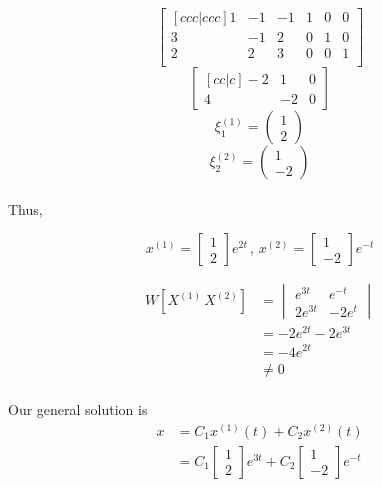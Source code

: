 \documentclass[letterpaper,12pt]{article}
\begin{document}
\[
\begin{bmatrix}[ccc|ccc]
     1& -1 & -1 & 1 & 0 & 0\\
    3 & -1 & 2 & 0 & 1 & 0\\
    2 & 2 & 3 & 0 & 0 & 1\\
\end{bmatrix}
\]
    \[
    \begin{bmatrix}[cc|c]
        -2 & 1 &0\\
        4 & -2 &0
\end{bmatrix}
\] 
\[
    \xi_1^{(1)} = 
    \begin{pmatrix}
        1 \\ 2
    \end{pmatrix}
\]
\[
    \xi_2^{(2)} = 
    \begin{pmatrix}
        1 \\ -2
    \end{pmatrix}
\]
\paragraph{}Thus,

\[
    x^{(1)}= \begin{bmatrix}
        1\\2
    \end{bmatrix}e^{2t}
    \,
    ,
    \,
    x^{(2)}=
    \begin{bmatrix}
        1\\-2
    \end{bmatrix}e^{-t}
\]

\begin{align*}
    W[X^{(1)}\, X^{(2)}] &= \begin{vmatrix}
        e^{3t} & e^{-t}\\
        2e^{3t} & -2e^{t}
    \end{vmatrix}\\
                         &= -2e^{2t} - 2e^{3t}\\
                         &= -4e^{2t}\\
                         &\ne 0
\end{align*}
\paragraph{}Our general solution is 
\begin{align*}
    x &= C_1 x^{(1)}(t) + C_2 x^{(2)}(t)\\
      &=C_1 \begin{bmatrix}
          1\\2
      \end{bmatrix}e^{3t}+
      C_2
      \begin{bmatrix}
          1\\-2
      \end{bmatrix}e^{-t}
\end{align*}
\end{document}
